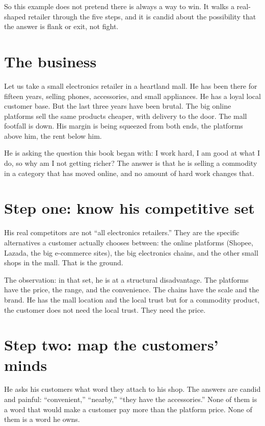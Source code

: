 \documentclass[10pt,twoside,openany]{memoir}
\newcommand{\needspacehead}{\needspace{4\baselineskip}}
\let\oldsection\section
\renewcommand{\section}{\needspacehead\oldsection}
\begin{document}
{So this example does not pretend there is always a way to win. It walks
a real-shaped retailer through the five steps, and it is candid about
the possibility that the answer is flank or exit, not fight.

\section{The business}\label{the-business-3}

Let us take a small electronics retailer in a heartland mall. He has
been there for fifteen years, selling phones, accessories, and small
appliances. He has a loyal local customer base. But the last three years
have been brutal. The big online platforms sell the same products
cheaper, with delivery to the door. The mall footfall is down. His
margin is being squeezed from both ends, the platforms above him, the
rent below him.

He is asking the question this book began with: I work hard, I am good
at what I do, so why am I not getting richer? The answer is that he is
selling a commodity in a category that has moved online, and no amount
of hard work changes that.

\section{Step one: know his competitive
set}\label{step-one-know-his-competitive-set-1}

His real competitors are not ``all electronics retailers.'' They are the
specific alternatives a customer actually chooses between: the online
platforms (Shopee, Lazada, the big e-commerce sites), the big
electronics chains, and the other small shops in the mall. That is the
ground.

The observation: in that set, he is at a structural disadvantage. The
platforms have the price, the range, and the convenience. The chains
have the scale and the brand. He has the mall location and the local
trust but for a commodity product, the customer does not need the local
trust. They need the price.

\section{Step two: map the customers'
minds}\label{step-two-map-the-customers-minds-2}

He asks his customers what word they attach to his shop. The answers are
candid and painful: ``convenient,'' ``nearby,'' ``they have the
accessories.'' None of them is a word that would make a customer pay
more than the platform price. None of them is a word he owns.

}
\end{document}
